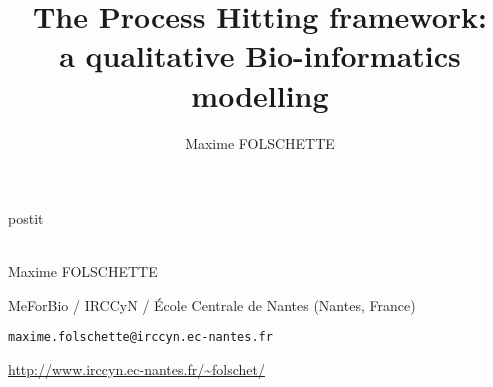 \documentclass[fleqn,10pt,c]{beamer}
\date{\thedate}
\title[The Process Hitting framework]{The Process Hitting framework:\\a qualitative Bio-informatics modelling}
\author{Maxime FOLSCHETTE}
\newcommand{\ex}[1]{\textcolor{couleurex}{#1}}
\newcommand{\tscite}[1]{\textcolor{couleurcit}{#1}}
\newcommand{\tcite}[1]{\tscite{[#1]}}
\newcommand{\tval}[1]{\textbf{#1}}
\begin{document}
\begin{frame}[plain,label=title]

\begin{center}
\vspace{1cm}
\begin{beamercolorbox}[sep=0.5em]{postit}
\centering
\Large
\textbf{%
{\normalsize\theconference{}}\\~\\%
\inserttitle
}
\end{beamercolorbox}

\par
\medskip
\bigskip
\normalsize
Maxime FOLSCHETTE

\medskip
\footnotesize
MeForBio / IRCCyN / École Centrale de Nantes (Nantes, France)

\texttt{maxime.folschette@irccyn.ec-nantes.fr}

\url{http://www.irccyn.ec-nantes.fr/~folschet/}
\end{center}

\end{frame}





\newcommand{\citeegfra}{\quad\tval{\ex{egfr20}}: \tcite{Epidermal Growth Factor Receptor, by Özgür Sahin \textit{et al.}}}
\newcommand{\citeegfrb}{\quad\tval{\ex{egfr104}}: \tcite{Epidermal Growth Factor Receptor, by Regina Samaga \textit{et al.}}}
\newcommand{\citetcrsiga}{\quad\tval{\ex{tcrsig40}}: \tcite{T-Cell Receptor Signaling, by Steffen Klamt \textit{et al.}}}
\newcommand{\citetcrsigb}{\quad\tval{\ex{tcrsig94}}: \tcite{T-Cell Receptor Signaling, by Julio Saez-Rodriguez \textit{et al.}}}

\newcommand{\citemodels}{\bigskip\citeegfra\\\citeegfrb\\\citetcrsiga\\\citetcrsigb}

\newcommand{\citepmrtcsb}{Paulevé \textit{et al.}, \textit{Transactions on Computational Systems Biology}, 2011}
\newcommand{\citepmrmscs}{Paulevé \textit{et al.}, \textit{Mathematical Structures in Computer Science}, 2012}
\newcommand{\citefpimrcmsb}{Folschette \textit{et al.}, \textit{Computational Methods in Systems Biology}, 2012}
\newcommand{\citefpmrcstobio}{Folschette \textit{et al.}, \textit{CS2Bio}, 2013}
\newcommand{\citedejong}{De Jong, \textit{Journal of Computational Biology}, 2002}
\end{document}
